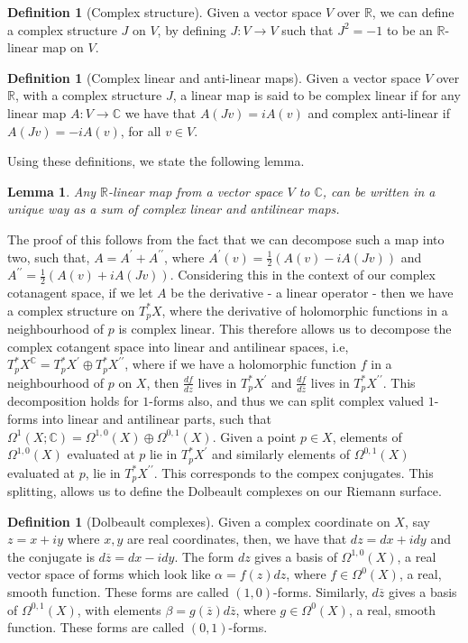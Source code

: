 \documentclass[11pt]{report}
\newtheorem{lemma}[thm]{Lemma}
\theoremstyle{definition}
\newtheorem{defn}[thm]{Definition}
\begin{document}
\begin{defn}[Complex structure]\label{Cstructure}
  Given a vector space $V$ over $\mathbb{R}$, we can define a complex structure $J$ on $V$, by defining $J : V \rightarrow V$ such that $J^2 = -1$ to be an $\mathbb{R}$-linear map on $V$.
\end{defn}
\begin{defn}[Complex linear and anti-linear maps]
  Given a vector space $V$ over $\mathbb{R}$, with a complex structure $J$, a linear map is said to be complex linear if for any linear map $A: V \rightarrow \mathbb{C}$ we have that $A(Jv)=iA(v)$ and complex anti-linear if $A(Jv) = -iA(v)$, for all $v \in V$.
\end{defn}
Using these definitions, we state the following lemma.
\begin{lemma}
  Any $\mathbb{R}$-linear map from a vector space $V$ to $\mathbb{C}$, can be written in a unique way as a sum of complex linear and antilinear maps.
\end{lemma}
The proof of this follows from the fact that we can decompose such a map into two, such that, $A = A^{\prime} + A^{\prime\prime}$, where $A^{\prime}(v) = \frac{1}{2}(A(v)-iA(Jv))$ and $A^{\prime\prime} = \frac{1}{2}(A(v)+iA(Jv))$. Considering this in the context of our complex cotanagent space, if we let $A$ be the derivative - a linear operator - then we have a complex structure on $T_p^*X$, where the derivative of holomorphic functions in a neighbourhood of $p$ is complex linear. This therefore allows us to decompose the complex cotangent space into linear and antilinear spaces, i.e, $T_p^*X^{\mathbb{C}} = T_p^*X^{\prime} \oplus T_p^*X^{\prime\prime}$, where if we have a holomorphic function $f$ in a neighbourhood of $p$ on $X$, then $\frac{df}{dz}$ lives in $T_p^*X^{\prime}$ and $\frac{df}{d\overline{z}}$ lives in $T_p^*X^{\prime\prime}$. This decomposition holds for $1$-forms also, and thus we can split complex valued $1$-forms into linear and antilinear parts, such that $\Omega^1(X;\mathbb{C}) = \Omega^{1,0}(X) \oplus \Omega^{0,1}(X)$. Given a point $p \in X$, elements of $\Omega^{1,0}(X)$ evaluated at $p$ lie in $T_p^*X^{\prime}$ and similarly elements of $\Omega^{0,1}(X)$ evaluated at $p$, lie in $T_p^*X^{\prime\prime}$. This corresponds to the compex conjugates. This splitting, allows us to define the Dolbeault complexes on our Riemann surface.
\begin{defn}[Dolbeault complexes]
  Given a complex coordinate on $X$, say $z=x+iy$ where $x,y$ are real coordinates, then, we have that $dz = dx+idy$ and the conjugate is  $d\overline{z} = dx - idy$. The form $dz$ gives a basis of $\Omega^{1,0}(X)$, a real vector space of forms which look like $\alpha = f(z)dz$, where $f \in \Omega^0(X)$, a real, smooth function. These forms are called $(1,0)$-forms. Similarly, $d\overline{z}$ gives a basis of $\Omega^{0,1}(X)$, with elements $\beta = g(\overline{z})d\overline{z}$, where $g \in \Omega^0(X)$, a real, smooth function. These forms are called $(0,1)$-forms.
\end{defn}
\end{document}
